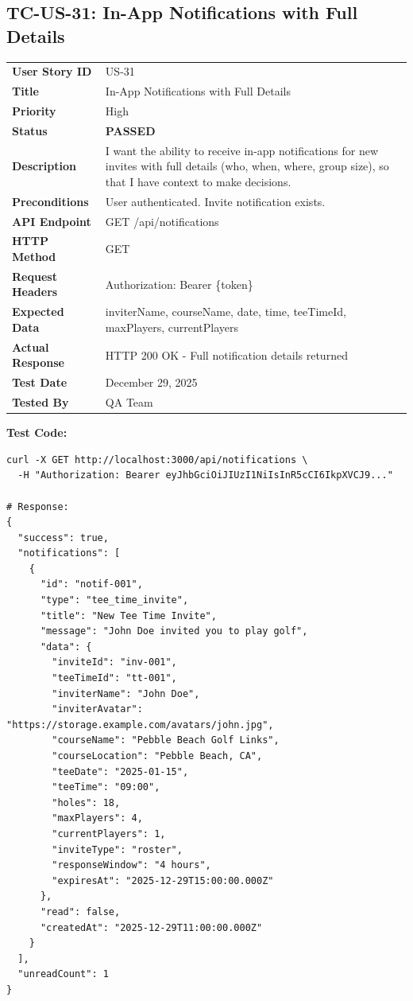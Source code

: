 \documentclass[11pt,a4paper]{article}
\newcommand{\passed}{\textcolor{pass}{\textbf{PASSED}}}
\begin{document}
\vspace{0.5cm}


\subsection{TC-US-31: In-App Notifications with Full Details}

\begin{tabularx}{\textwidth}{|p{3.2cm}|Y|}
\hline
{}
 \\
\hline
\textbf{User Story ID} & US-31 \\
\hline
\textbf{Title} & In-App Notifications with Full Details \\
\hline
\textbf{Priority} & High \\
\hline
\textbf{Status} & \passed \\
\hline
\textbf{Description} & I want the ability to receive in-app notifications for new invites with full details (who, when, where, group size), so that I have context to make decisions. \\
\hline
\textbf{Preconditions} & User authenticated. Invite notification exists. \\
\hline
\textbf{API Endpoint} & GET /api/notifications \\
\hline
\textbf{HTTP Method} & GET \\
\hline
\textbf{Request Headers} & Authorization: Bearer \{token\} \\
\hline
\textbf{Expected Data} & inviterName, courseName, date, time, teeTimeId, maxPlayers, currentPlayers \\
\hline
\textbf{Actual Response} & HTTP 200 OK - Full notification details returned \\
\hline
\textbf{Test Date} & December 29, 2025 \\
\hline
\textbf{Tested By} & QA Team \\
\hline
\end{tabularx}

\vspace{0.3cm}
\textbf{Test Code:}
\begin{lstlisting}
curl -X GET http://localhost:3000/api/notifications \
  -H "Authorization: Bearer eyJhbGciOiJIUzI1NiIsInR5cCI6IkpXVCJ9..."

# Response:
{
  "success": true,
  "notifications": [
    {
      "id": "notif-001",
      "type": "tee_time_invite",
      "title": "New Tee Time Invite",
      "message": "John Doe invited you to play golf",
      "data": {
        "inviteId": "inv-001",
        "teeTimeId": "tt-001",
        "inviterName": "John Doe",
        "inviterAvatar": "https://storage.example.com/avatars/john.jpg",
        "courseName": "Pebble Beach Golf Links",
        "courseLocation": "Pebble Beach, CA",
        "teeDate": "2025-01-15",
        "teeTime": "09:00",
        "holes": 18,
        "maxPlayers": 4,
        "currentPlayers": 1,
        "inviteType": "roster",
        "responseWindow": "4 hours",
        "expiresAt": "2025-12-29T15:00:00.000Z"
      },
      "read": false,
      "createdAt": "2025-12-29T11:00:00.000Z"
    }
  ],
  "unreadCount": 1
}
\end{lstlisting}
\end{document}
